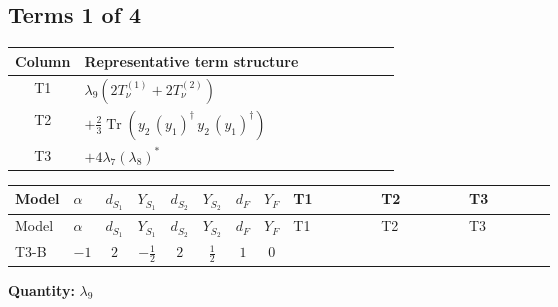 \documentclass[8pt]{article}
\begin{document}
\begin{landscape}
\subsection*{Terms 1 of 4}
\begin{center}
\begin{tabular}{@{}c >{\raggedright\arraybackslash}p{0.82\linewidth}@{}}
\toprule
Column & Representative term structure \\
\midrule
T1 & \(\displaystyle {\lambda_{9}} (2 T_{\nu}^{(1)}+2 T_{\nu}^{(2)})\) \\
\midrule
T2 & \(\displaystyle +\frac{2}{3} \operatorname{Tr}\!\left({y_2}\,\left({y_1}\right)^{\dagger}\,{y_2}\,\left({y_1}\right)^{\dagger}\right)\) \\
\midrule
T3 & \(\displaystyle +4 {\lambda_{7}} \left({\lambda_{8}}\right)^{*}\) \\
\midrule
\bottomrule
\end{tabular}
\end{center}
\smallskip
\tiny
\begin{longtable}{@{}llcccccc >{\raggedright\arraybackslash}p{0.21\linewidth} >{\raggedright\arraybackslash}p{0.21\linewidth} >{\raggedright\arraybackslash}p{0.21\linewidth}@{}}
\toprule
Model & $\alpha$ & $d_{S_1}$ & $Y_{S_1}$ & $d_{S_2}$ & $Y_{S_2}$ & $d_F$ & $Y_F$ & T1 & T2 & T3 \\
\midrule
\endfirsthead
\toprule
Model & $\alpha$ & $d_{S_1}$ & $Y_{S_1}$ & $d_{S_2}$ & $Y_{S_2}$ & $d_F$ & $Y_F$ & T1 & T2 & T3 \\
\midrule
\endhead
T3-B & $-1$ & $2$ & $-\frac{1}{2}$ & $2$ & $\frac{1}{2}$ & $1$ & $0$ & \scriptsize\adjustbox{max width=\linewidth}{$\begin{gathered} {\lambda_{9}} (2 T_{\nu}^{(1)}+2 T_{\nu}^{(2)})\end{gathered}$} & \scriptsize\adjustbox{max width=\linewidth}{$\begin{gathered} +\frac{2}{3} \operatorname{Tr}\!\left({y_2}\,\left({y_1}\right)^{\dagger}\,{y_2}\,\left({y_1}\right)^{\dagger}\right)\end{gathered}$} & \scriptsize\adjustbox{max width=\linewidth}{$\begin{gathered} +4 {\lambda_{7}} \left({\lambda_{8}}\right)^{*}\end{gathered}$} \\
\midrule
\bottomrule
\end{longtable}
\clearpage
\noindent\textbf{Quantity: }$\lambda_{9}$\par\smallskip

\end{landscape}
\end{document}
